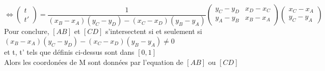 \documentclass[10pt,fleqn]{article}
\begin{document}
\[\iff\begin{pmatrix}t\\t'\end{pmatrix}=
\frac{1}{(x_B-x_A)(y_C-y_D)-(x_C-x_D)(y_B-y_A)}
\begin{pmatrix}
	y_C-y_D & x_D-x_C\\
	y_A-y_B & x_B-x_A
\end{pmatrix}
\begin{pmatrix}
	x_C-x_A\\
	y_C-y_A
\end{pmatrix}
\]
Pour conclure, $[AB]$ et $[CD]$ s'intersectent si et seulement si\\
$(x_B-x_A)(y_C-y_D)-(x_C-x_D)(y_B-y_A)\neq 0$ \\et t, t' tels que d\'efinis ci-dessus sont dans $[0,1]$\\
Alors les coordon\'ees de M sont donn\'ees par l'equation de $[AB]$ ou $[CD]$
\end{document}
